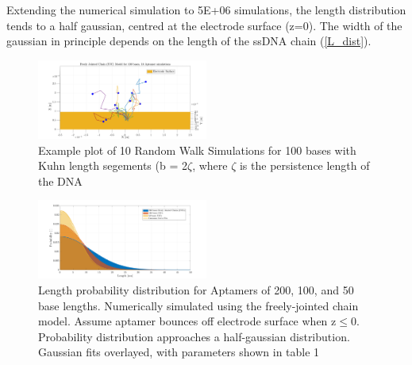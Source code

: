 Extending the numerical simulation to 5E+06 simulations, the length distribution tends to a half gaussian, centred at the electrode surface (z=0). The width of the gaussian in principle depends on the length of the ssDNA chain (\autoref{L_dist}). 
\vspace{-3cm}
\begin{figure}[H]
    \centering
    \includegraphics[width = 0.5\textwidth]{img/DNA_100_base_simulation_v1.png}
    \caption{Example plot of 10 Random Walk Simulations for 100 bases with Kuhn length segements (b = 2$\zeta$, where $\zeta$ is the persistence length of the DNA}
    \label{Apt_sim}
\end{figure}
\begin{figure}[H]
    \centering
    \includegraphics[width = 0.5\textwidth]{img/length_with_gaussians.png}
    \caption{Length probability distribution for Aptamers of 200, 100, and 50 base lengths. Numerically simulated using the freely-jointed chain model. Assume aptamer bounces off electrode surface when z$\leq$0. Probability distribution approaches a half-gaussian distribution. Gaussian fits overlayed, with parameters shown in table 1}
    \label{L_dist}
\end{figure}

